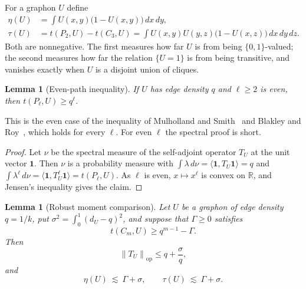\documentclass[11pt]{article}
\newtheorem{lemma}[theorem]{Lemma}
\theoremstyle{remark}
\newcommand{\ind}{\mathbf{1}}
\newcommand{\R}{\mathbb{R}}
\newcommand{\op}{\mathrm{op}}
\newcommand{\norm}[1]{\left\lVert #1\right\rVert}
\begin{document}
For a graphon $U$ define
\begin{align}
 \eta(U)&=\int U(x,y)\bigl(1-U(x,y)\bigr)\,dx\,dy,\label{eq:eta-def}\\
 \tau(U)&=t(P_2,U)-t(C_3,U)
 =\int U(x,y)U(y,z)\bigl(1-U(x,z)\bigr)\,dx\,dy\,dz.\label{eq:tau-def}
\end{align}
Both are nonnegative. The first measures how far $U$ is from being
$\{0,1\}$-valued; the second measures how far the relation
$\{U=1\}$ is from being transitive, and vanishes exactly when $U$ is a
disjoint union of cliques.

\begin{lemma}[Even-path inequality]\label{lem:path}
If $U$ has edge density $q$ and $\ell\geq2$ is even, then
$t(P_\ell,U)\geq q^\ell$.
\end{lemma}

This is the even case of the inequality of Mulholland and
Smith~\cite{mulholland1959inequality} and Blakley and
Roy~\cite{blakley1965holder}, which holds for every $\ell$. For even $\ell$
the spectral proof is short.

\begin{proof}
Let $\nu$ be the spectral measure of the self-adjoint operator $T_U$ at
the unit vector $\ind$. Then $\nu$ is a probability measure with
$\int\lambda\,d\nu=\langle\ind,T_U\ind\rangle=q$ and
$\int\lambda^\ell\,d\nu=\langle\ind,T_U^\ell\ind\rangle=t(P_\ell,U)$. As
$\ell$ is even, $x\mapsto x^\ell$ is convex on $\R$, and Jensen's
inequality gives the claim.
\end{proof}

\begin{lemma}[Robust moment comparison]\label{lem:spectral}
Let $U$ be a graphon of edge density $q=1/k$, put
$\sigma^2=\int_0^1(d_U-q)^2$, and suppose that $\Gamma\geq0$ satisfies
\begin{equation}\label{eq:moment-hypothesis}
 t(C_m,U)\geq q^{m-1}-\Gamma .
\end{equation}
Then
\begin{equation}\label{eq:operator-bound}
 \norm{T_U}_{\op}\leq q+\frac{\sigma}{q},
\end{equation}
and
\begin{equation}\label{eq:eta-tau-bound}
 \eta(U)\ \lesssim\ \Gamma+\sigma,
 \qquad
 \tau(U)\ \lesssim\ \Gamma+\sigma .
\end{equation}
\end{lemma}
\end{document}
